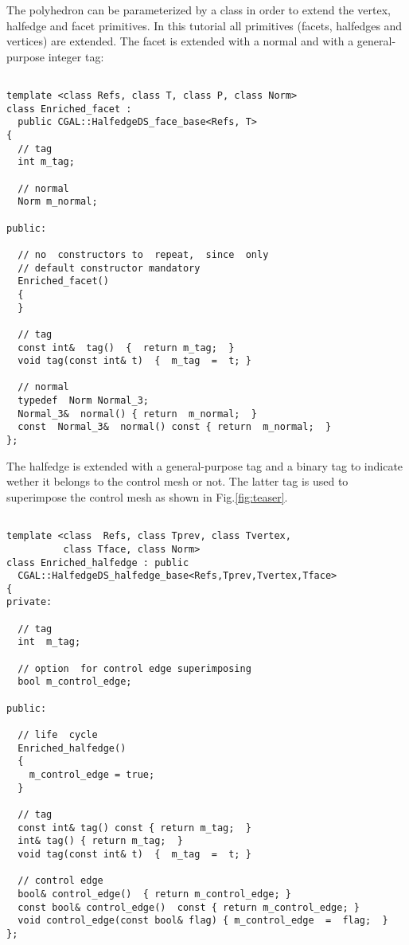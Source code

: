 The polyhedron can be parameterized by a  class in
order to extend the vertex, halfedge and facet primitives. In this
tutorial all primitives (facets, halfedges and vertices) are
extended. The facet is extended with a normal and with a
general-purpose integer tag:

{ \scriptsize
\begin{verbatim}

template <class	Refs, class T, class P, class Norm>
class Enriched_facet : 
  public CGAL::HalfedgeDS_face_base<Refs, T>
{
  // tag
  int m_tag;

  // normal
  Norm m_normal;

public:

  // no  constructors to  repeat,  since  only
  // default constructor mandatory
  Enriched_facet()
  {
  }

  // tag
  const int&  tag()  {  return m_tag;  }
  void tag(const int& t)  {  m_tag  =  t; }

  // normal
  typedef  Norm Normal_3;
  Normal_3&  normal() { return  m_normal;  }
  const  Normal_3&  normal() const { return  m_normal;  }
};
\end{verbatim}}

The halfedge is extended with a general-purpose tag and a binary tag
to indicate wether it belongs to the control mesh or not. The latter
tag is used to superimpose the control mesh as shown in
Fig.\ref{fig:teaser}.

{ \scriptsize
\begin{verbatim}

template <class  Refs, class Tprev, class Tvertex, 
          class Tface, class Norm>
class Enriched_halfedge : public 
  CGAL::HalfedgeDS_halfedge_base<Refs,Tprev,Tvertex,Tface>
{
private:

  // tag
  int  m_tag; 

  // option  for control edge superimposing
  bool m_control_edge; 

public:

  // life  cycle
  Enriched_halfedge()
  {
    m_control_edge = true;
  }

  // tag
  const int& tag() const { return m_tag;  }
  int& tag() { return m_tag;  }
  void tag(const int& t)  {  m_tag  =  t; }

  // control edge  
  bool& control_edge()  { return m_control_edge; }
  const bool& control_edge()  const { return m_control_edge; }
  void control_edge(const bool& flag) { m_control_edge  =  flag;  }
};

\end{verbatim}}

